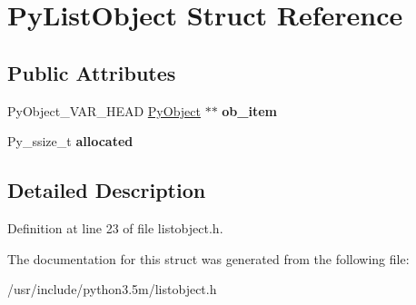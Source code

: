 \hypertarget{structPyListObject}{}\section{Py\+List\+Object Struct Reference}
\label{structPyListObject}
\subsection*{Public Attributes}
\begin{DoxyCompactItemize}
\item 
Py\+Object\+\_\+\+V\+A\+R\+\_\+\+H\+E\+AD \hyperlink{struct__object}{Py\+Object} $\ast$$\ast$ {\bfseries ob\+\_\+item}\hypertarget{structPyListObject_acf0d6da7facc80844c97ce9924b0a552}{}\label{structPyListObject_acf0d6da7facc80844c97ce9924b0a552}

\item 
Py\+\_\+ssize\+\_\+t {\bfseries allocated}\hypertarget{structPyListObject_aee6a653357317c00222fe91f315bc9b7}{}\label{structPyListObject_aee6a653357317c00222fe91f315bc9b7}

\end{DoxyCompactItemize}


\subsection{Detailed Description}


Definition at line 23 of file listobject.\+h.



The documentation for this struct was generated from the following file\+:\begin{DoxyCompactItemize}
\item 
/usr/include/python3.\+5m/listobject.\+h\end{DoxyCompactItemize}
